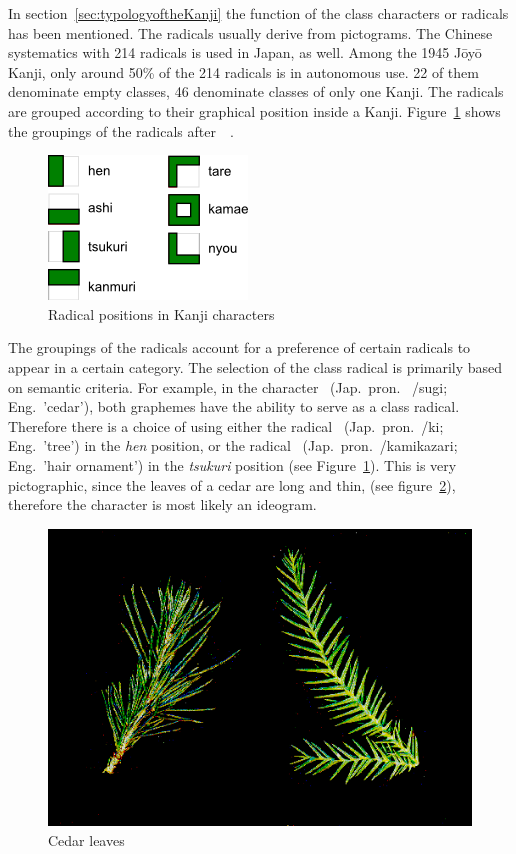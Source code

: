 In section~\ref{sec:typologyoftheKanji} the function of the class characters or
radicals has been mentioned. The radicals usually derive from pictograms. The
Chinese systematics with 214 radicals is used in Japan, as well. Among the 
1945 Jōyō Kanji, only around 50\% of the 214 radicals is in autonomous use.
22 of them denominate empty classes, 46 denominate classes of only one Kanji.
The radicals are grouped according to their graphical position inside a Kanji.
Figure~\ref{fig:radicalPositions} shows the groupings of the radicals 
after~~\citeyear{Foljanty1984}.
\begin{figure}[htbp]
\begin{center}
\includegraphics{images/radicalStructure/radicalPositions.png}
\caption{Radical positions in Kanji characters}
\label{fig:radicalPositions}
\end{center}
\end{figure}
The groupings of the radicals account for a preference of certain radicals
to appear in a certain category. The selection of the class radical is primarily
based on semantic criteria. For example, in the character ~(Jap.~pron.~
/sugi; Eng.~'cedar'), both graphemes have the ability to serve as a 
class radical. Therefore there is a choice of using either the radical 
~(Jap.~pron.~/ki; Eng.~'tree') in the \emph{hen} position, 
or the radical ~(Jap.~pron.~/kamikazari; 
Eng.~'hair ornament') in the \emph{tsukuri} position (see 
Figure~\ref{fig:radicalPositions}). This is very pictographic, since the leaves
of a cedar are long and thin, (see figure~\ref{fig:cedarleaves}), 
therefore the character is most likely an ideogram.
\begin{figure}[htbp]
\begin{center}
\includegraphics[scale=0.4]{images/radicalStructure/cedar.png}
\caption{Cedar leaves}
\label{fig:cedarleaves}
\end{center}
\end{figure}

